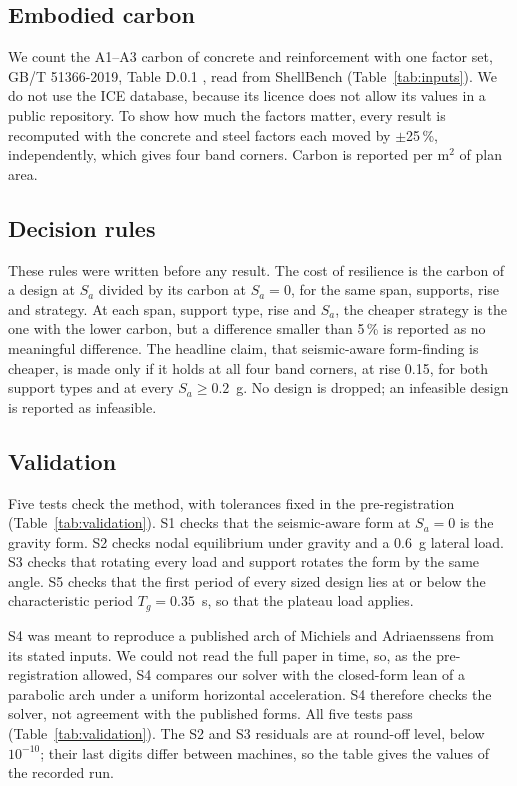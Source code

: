 \documentclass[preprint,12pt]{elsarticle}
\begin{document}
\subsection{Embodied carbon}

We count the A1--A3 carbon of concrete and reinforcement with one factor set, GB/T 51366-2019, Table D.0.1 \cite{GBT51366}, read from ShellBench (Table~\ref{tab:inputs}). We do not use the ICE database, because its licence does not allow its values in a public repository. To show how much the factors matter, every result is recomputed with the concrete and steel factors each moved by $\pm$25\,\%, independently, which gives four band corners. Carbon is reported per m$^2$ of plan area.

\subsection{Decision rules}

These rules were written before any result. The cost of resilience is the carbon of a design at $S_a$ divided by its carbon at $S_a = 0$, for the same span, supports, rise and strategy. At each span, support type, rise and $S_a$, the cheaper strategy is the one with the lower carbon, but a difference smaller than 5\,\% is reported as no meaningful difference. The headline claim, that seismic-aware form-finding is cheaper, is made only if it holds at all four band corners, at rise 0.15, for both support types and at every $S_a \geq 0.2$~g. No design is dropped; an infeasible design is reported as infeasible.

\subsection{Validation}

Five tests check the method, with tolerances fixed in the pre-registration (Table~\ref{tab:validation}). S1 checks that the seismic-aware form at $S_a = 0$ is the gravity form. S2 checks nodal equilibrium under gravity and a 0.6~g lateral load. S3 checks that rotating every load and support rotates the form by the same angle. S5 checks that the first period of every sized design lies at or below the characteristic period $T_g = 0.35$~s, so that the plateau load applies.

S4 was meant to reproduce a published arch of Michiels and Adriaenssens \cite{Michiels2018CS} from its stated inputs. We could not read the full paper in time, so, as the pre-registration allowed, S4 compares our solver with the closed-form lean of a parabolic arch under a uniform horizontal acceleration. S4 therefore checks the solver, not agreement with the published forms. All five tests pass (Table~\ref{tab:validation}). The S2 and S3 residuals are at round-off level, below $10^{-10}$; their last digits differ between machines, so the table gives the values of the recorded run.
\end{document}
